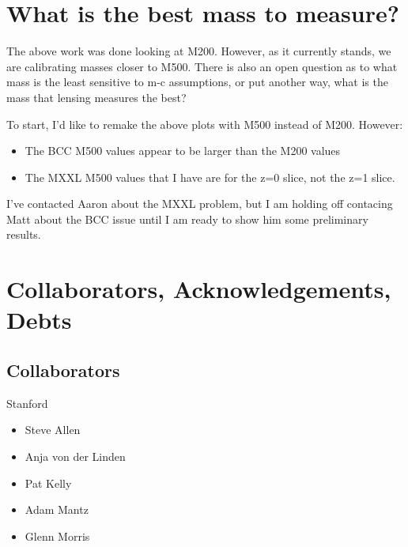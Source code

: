 \documentclass[11pt]{article}
\begin{document}
\section{What is the best mass to measure?}

The above work was done looking at M200. However, as it currently stands, we are calibrating masses closer to M500. There is also an open question as to what mass is the least sensitive to m-c assumptions, or put another way, what is the mass that lensing measures the best?

To start, I'd like to remake the above plots with M500 instead of M200. However:

\begin{itemize}
\item The BCC M500 values appear to be larger than the M200 values
\item The MXXL M500 values that I have are for the z=0 slice, not the z=1 slice.
\end{itemize}

I've contacted Aaron about the MXXL problem, but I am holding off contacing Matt about the BCC issue until I am ready to show him some preliminary results.



\clearpage \newpage

\section{Collaborators, Acknowledgements, Debts}

\subsection{Collaborators}

Stanford
\begin{itemize}
\item Steve Allen
\item Anja von der Linden
\item Pat Kelly
\item Adam Mantz
\item Glenn Morris
\end{itemize}
\end{document}
